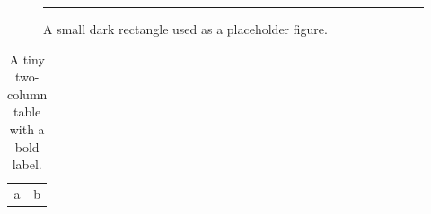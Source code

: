\documentclass{article}
\begin{document}
\begin{figure}
\centering
\rule{3cm}{2cm}
\caption{A small dark rectangle used as a placeholder figure.}
\end{figure}
\begin{table}
\centering
\begin{tabular}{cc}
a & b \\
\end{tabular}
\caption{A tiny two-column table with a bold label.}
\end{table}
\end{document}
